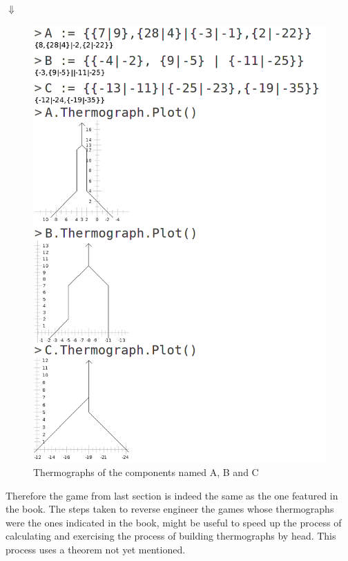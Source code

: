 \begingroup
{}%

\endgroup
\begin{center}
	$\Downarrow$
\end{center}
\begin{figure}
\begin{center}
\includegraphics[scale=0.3]{../images/resulting_thermographs.png}
\end{center}
\caption{Thermographs of the components named A, B and C}
\end{figure}

Therefore the game from last section is indeed the same as the one featured in the book. The steps taken to reverse engineer the games whose thermographs were the ones indicated in the book, might be useful to speed up the process of calculating and exercising the process of building thermographs by head. This process uses a theorem not yet mentioned.

